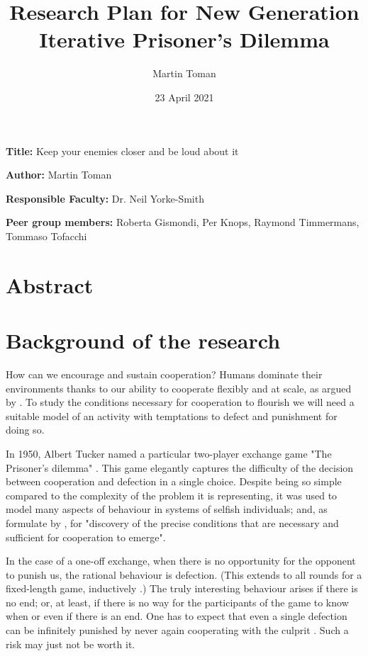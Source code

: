 \documentclass[english]{article}
\title{Research Plan for New Generation Iterative Prisoner's Dilemma}
\author{Martin Toman}
\date{23 April 2021}
\newcommand{\namelistlabel}[1]{\mbox{#1}\hfil}
\newenvironment{namelist}[1]{%
\begin{list}{}{
  \let\makelabel\namelistlabel
  \settowidth{\labelwidth}{#1}
  \setlength{\leftmargin}{1.1\labelwidth}
}}{%
\end{list}}
\begin{document}
\listoftodos

\maketitle
\begin{namelist}{}
\item[{\bf Title:}]
  Keep your enemies closer and be loud about it
\item[{\bf Author:}]
  Martin Toman
\item[{\bf Responsible Faculty:}]
  Dr. Neil Yorke-Smith
\item[{\bf Peer group members:}]
  Roberta Gismondi,
  Per Knops,
  Raymond Timmermans,
  Tommaso Tofacchi
\end{namelist}



\section*{Abstract}



\section*{Background of the research}

How can we encourage and sustain cooperation? Humans dominate their environments thanks to our ability to cooperate flexibly and at scale, as argued by \citet{harari-sapiens}.
To study the conditions necessary for cooperation to flourish we will need a suitable model of an activity with temptations to defect and punishment for doing so.

In 1950, Albert Tucker named a particular two-player exchange game "The Prisoner's dilemma" \citep{sep-prisoner-dilemma}.
This game elegantly captures the difficulty of the decision between cooperation and defection in a single choice.
Despite being so simple compared to the complexity of the problem it is representing, it was used to model many aspects of behaviour in systems of selfish individuals; and, as formulate by \citet{Axelrod84}, for "discovery of the precise conditions that are necessary and sufficient for cooperation to emerge".

In the case of a one-off exchange, when there is no opportunity for the opponent to punish us, the rational behaviour is defection. (This extends to all rounds for a fixed-length game, inductively \citep{Axelrod84}.)
The truly interesting behaviour arises if there is no end; or, at least, if there is no way for the participants of the game to know when or even if there is an end.
One has to expect that even a single defection can be infinitely punished by never again cooperating with the culprit \citep{GRIM}.
Such a risk may just not be worth it.
\end{document}
